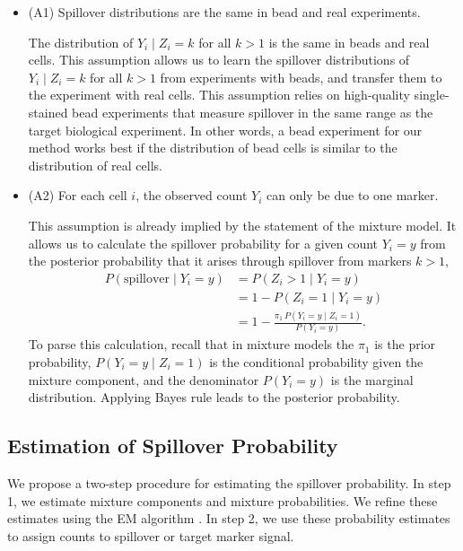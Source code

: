 \documentclass{bioinfo}
\begin{document}
\begin{itemize}
\item
  (A1) Spillover distributions are the same in bead and real
  experiments.

  The distribution of \(Y_i \mid Z_i = k\) for all \(k > 1\) is the same
  in beads and real cells. This assumption allows us to learn the
  spillover distributions of \(Y_i \mid Z_i = k\) for all \(k > 1\) from
  experiments with beads, and transfer them to the experiment with real
  cells. This assumption relies on high-quality single-stained bead
  experiments that measure spillover in the same range as the target
  biological experiment. In other words, a bead experiment for our
  method works best if the distribution of bead cells is similar to the
  distribution of real cells.
\item
  (A2) For each cell \(i\), the observed count \(Y_i\) can only be due
  to one marker.

  This assumption is already implied by the statement of the mixture
  model. It allows us to calculate the spillover probability for a given
  count \(Y_i = y\) from the posterior probability that it arises
  through spillover from markers \(k > 1\), \[
  \begin{split}
  P(\text{spillover} \mid Y_i = y) & = P(Z_i > 1 \mid Y_i = y) \\
  & = 1 - P(Z_i = 1 \mid Y_i = y) \\
  & = 1 - \frac{\pi_1 \, P(Y_i = y \mid Z_i = 1)}{P(Y_i = y)}.
  \end{split}
  \] To parse this calculation, recall that in mixture models the
  \(\pi_1\) is the prior probability, \(P(Y_i = y \mid Z_i = 1)\) is the
  conditional probability given the mixture component, and the
  denominator \(P(Y_i = y)\) is the marginal distribution. Applying
  Bayes rule leads to the posterior probability.
\end{itemize}

\subsection{Estimation of Spillover Probability}

We propose a two-step procedure for estimating the spillover
probability. In step 1, we estimate mixture components and mixture
probabilities. We refine these estimates using the EM algorithm
\citep{dempster1977maximum}. In step 2, we use these probability
estimates to assign counts to spillover or target marker signal.
\end{document}
